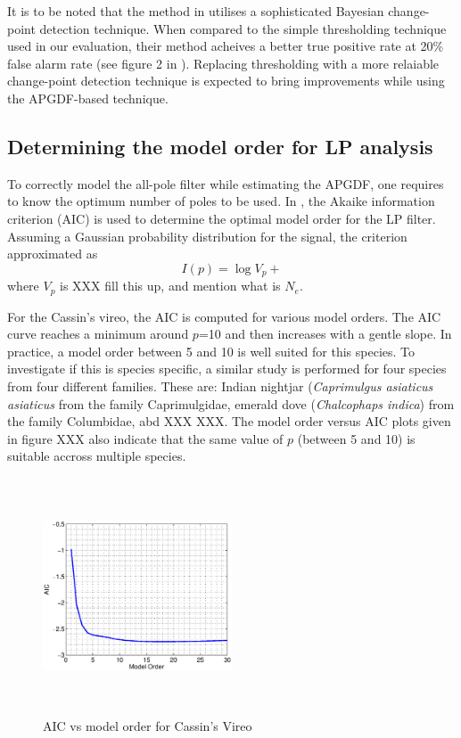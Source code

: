 \documentclass[a4paper]{article}
\begin{document}
It is to be noted that the method in \cite{wang2013} utilises a sophisticated
Bayesian change-point detection technique. When compared to the simple
thresholding technique used in our evaluation, their method acheives a better
true positive rate at 20\% false alarm rate (see figure 2 in \cite{wang2013}).
Replacing thresholding with a more relaiable change-point detection technique 
is expected to bring improvements while using the APGDF-based technique.

\subsection{Determining the model order for LP analysis}

To correctly model the all-pole filter while estimating the APGDF, one requires
to know the optimum number of poles to be used. In \cite{makhoul}, the Akaike
information criterion (AIC) is used to determine the optimal model order for the
LP filter. Assuming a Gaussian probability distribution for the signal, the
criterion approximated as
\begin{equation}
I(p) = \log V_p + 
\end{equation}
where $V_p$ is
XXX fill this up, and mention what is $N_e$.

For the Cassin's vireo, the AIC is computed for various model orders. The AIC
curve reaches a minimum around $p$=10 and then increases with a gentle slope. In
practice, a model order between 5 and 10 is well suited for this species.
To investigate if this is species specific, a similar study is performed for
four species from four different families. These are: Indian nightjar
(\textit{Caprimulgus asiaticus asiaticus} from the family Caprimulgidae, emerald
dove (\textit{Chalcophaps indica}) from the family Columbidae, abd XXX XXX.
The model order versus AIC plots given in figure XXX also indicate that the same value
of $p$ (between 5 and 10) is suitable accross multiple species.

 \begin{figure}[!ht]
	\centering
	\includegraphics[width=0.5\textwidth,height=7cm] {cassins_AIC.eps}
	\caption{AIC vs model order for Cassin's Vireo }   
	\label{fig:AIC_cassins}
\end{figure} 
\end{document}
